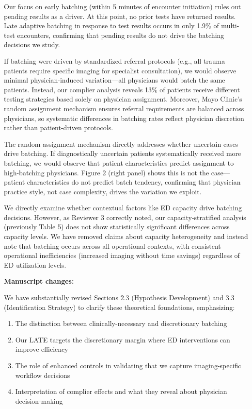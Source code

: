 \documentclass[11pt]{article}
\newcommand{\1}{\hbox{\rm 1\kern-.35em 1}}
\begin{document}
Our focus on early batching (within 5 minutes of encounter initiation) rules out pending results as a driver. At this point, no prior tests have returned results. Late adaptive batching in response to test results occurs in only 1.9\% of multi-test encounters, confirming that pending results do not drive the batching decisions we study.

If batching were driven by standardized referral protocols (e.g., all trauma patients require specific imaging for specialist consultation), we would observe minimal physician-induced variation—all physicians would batch the same patients. Instead, our complier analysis reveals 13\% of patients receive different testing strategies based solely on physician assignment. Moreover, Mayo Clinic's random assignment mechanism ensures referral requirements are balanced across physicians, so systematic differences in batching rates reflect physician discretion rather than patient-driven protocols.

The random assignment mechanism directly addresses whether uncertain cases drive batching. If diagnostically uncertain patients systematically received more batching, we would observe that patient characteristics predict assignment to high-batching physicians. Figure 2 (right panel) shows this is not the case—patient characteristics do not predict batch tendency, confirming that physician practice style, not case complexity, drives the variation we exploit.

We directly examine whether contextual factors like ED capacity drive batching decisions. However, as Reviewer 3 correctly noted, our capacity-stratified analysis (previously Table 5) does not show statistically significant differences across capacity levels. We have removed claims about capacity heterogeneity and instead note that batching occurs across all operational contexts, with consistent operational inefficiencies (increased imaging without time savings) regardless of ED utilization levels.

\textbf{Manuscript changes:}

We have substantially revised Sections 2.3 (Hypothesis Development) and 3.3 (Identification Strategy) to clarify these theoretical foundations, emphasizing:

\begin{enumerate}
\item The distinction between clinically-necessary and discretionary batching
\item Our LATE targets the discretionary margin where ED interventions can improve efficiency
\item The role of enhanced controls in validating that we capture imaging-specific workflow decisions
\item Interpretation of complier effects and what they reveal about physician decision-making
\end{enumerate}
\end{document}
